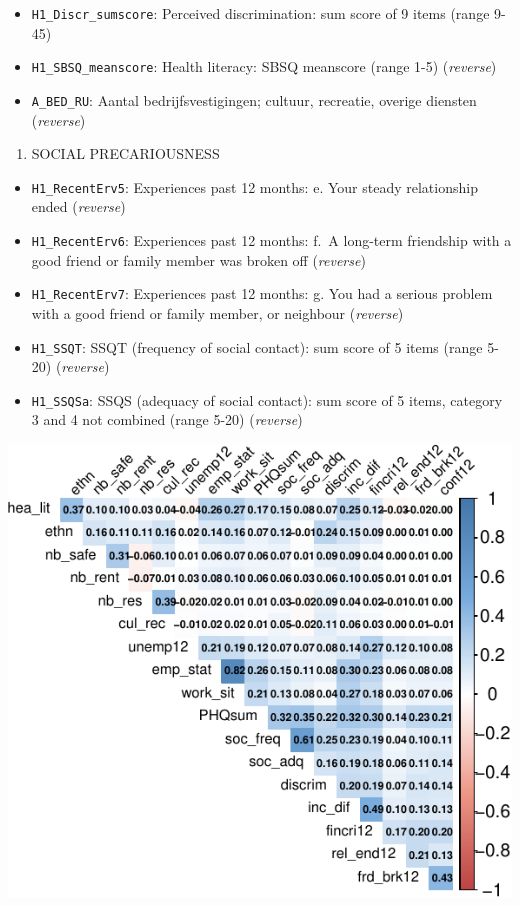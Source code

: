 \documentclass[
]{article}
\providecommand{\tightlist}{%
  \setlength{\itemsep}{0pt}\setlength{\parskip}{0pt}}\usepackage{longtable,booktabs,array}
\begin{document}
\begin{itemize}
\tightlist
\item
  \texttt{H1\_Discr\_sumscore}: Perceived discrimination: sum score of 9
  items (range 9-45)
\item
  \texttt{H1\_SBSQ\_meanscore}: Health literacy: SBSQ meanscore (range
  1-5) (\emph{reverse})
\item
  \texttt{A\_BED\_RU}: Aantal bedrijfsvestigingen; cultuur, recreatie,
  overige diensten (\emph{reverse})
\end{itemize}

\begin{enumerate}
\def\labelenumi{\arabic{enumi}.}
\setcounter{enumi}{4}
\tightlist
\item
  SOCIAL PRECARIOUSNESS
\end{enumerate}

\begin{itemize}
\tightlist
\item
  \texttt{H1\_RecentErv5}: Experiences past 12 months: e. Your steady
  relationship ended (\emph{reverse})
\item
  \texttt{H1\_RecentErv6}: Experiences past 12 months: f.~A long-term
  friendship with a good friend or family member was broken off
  (\emph{reverse})
\item
  \texttt{H1\_RecentErv7}: Experiences past 12 months: g. You had a
  serious problem with a good friend or family member, or neighbour
  (\emph{reverse})
\item
  \texttt{H1\_SSQT}: SSQT (frequency of social contact): sum score of 5
  items (range 5-20) (\emph{reverse})
\item
  \texttt{H1\_SSQSa}: SSQS (adequacy of social contact): sum score of 5
  items, category 3 and 4 not combined (range 5-20) (\emph{reverse})
\end{itemize}

\begin{center}
\includegraphics{draft_v3_files/figure-pdf/unnamed-chunk-12-1.pdf}
\end{center}
\end{document}
